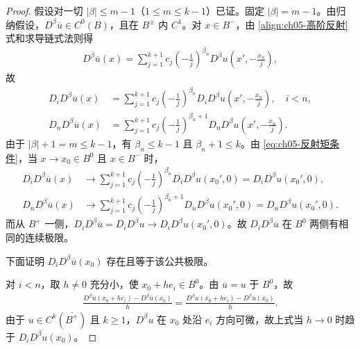 \documentclass[../../main.tex]{subfiles}
\begin{document}
\begin{proof}
假设对一切 $|\beta|\leqslant m-1$（$1\leqslant m\leqslant k-1$）已证。固定 $|\beta|=m-1$。由归纳假设，$D^{\beta}\overline{u}\in C^{0}(B)$，且在 $B^{\pm}$ 内 $C^{1}$。对 $x\in B^{-}$，由 \eqref{align:ch05-高阶反射}式和求导链式法则得
\begin{align}
D^{\beta}\overline{u}(x)
=\sum_{j=1}^{k+1}c_j\left(-\frac{1}{j}\right)^{\beta_n}
D^{\beta}u\left(x',-\frac{x_n}{j}\right),
\label{eq:ch05-反射导数}
\end{align}
故
\begin{align*}
D_iD^{\beta}\overline{u}(x)
&=\sum_{j=1}^{k+1}c_j\left(-\frac{1}{j}\right)^{\beta_n}
D_iD^{\beta}u\left(x',-\frac{x_n}{j}\right),\quad i<n,\\
D_nD^{\beta}\overline{u}(x)
&=\sum_{j=1}^{k+1}c_j\left(-\frac{1}{j}\right)^{\beta_n+1}
D_nD^{\beta}u\left(x',-\frac{x_n}{j}\right).
\end{align*}
由于 $|\beta|+1=m\leqslant k-1$，有 $\beta_n\leqslant k-1$ 且 $\beta_n+1\leqslant k$。由 \eqref{eq:ch05-反射矩条件}，当 $x\to x_0\in B^{0}$ 且 $x\in B^{-}$ 时，
\begin{align*}
D_iD^{\beta}\overline{u}(x)
&\longrightarrow\sum_{j=1}^{k+1}c_j\left(-\frac{1}{j}\right)^{\beta_n}D_iD^{\beta}u(x_0',0)
=D_iD^{\beta}u(x_0',0),\\
D_nD^{\beta}\overline{u}(x)
&\longrightarrow\sum_{j=1}^{k+1}c_j\left(-\frac{1}{j}\right)^{\beta_n+1}D_nD^{\beta}u(x_0',0)
=D_nD^{\beta}u(x_0',0).
\end{align*}
而从 $B^{+}$ 一侧，$D_iD^{\beta}\overline{u}=D_iD^{\beta}u\to D_iD^{\beta}u(x_0',0)$。故 $D_iD^{\beta}\overline{u}$ 在 $B^{0}$ 两侧有相同的连续极限。

下面证明 $D_iD^{\beta}\overline{u}(x_0)$ 存在且等于该公共极限。

对 $i<n$，取 $h\neq0$ 充分小，使 $x_0+he_i\in B^{0}$。由 $\overline{u}=u$ 于 $B^{0}$，故
\begin{align*}
\frac{D^{\beta}\overline{u}(x_0+he_i)-D^{\beta}\overline{u}(x_0)}{h}
=\frac{D^{\beta}u(x_0+he_i)-D^{\beta}u(x_0)}{h}.
\end{align*}
由于 $u\in C^{k}(\overline{B^{+}})$ 且 $k\geqslant1$，$D^{\beta}u$ 在 $x_0$ 处沿 $e_i$ 方向可微，故上式当 $h\to0$ 时趋于 $D_iD^{\beta}u(x_0)$。


\end{proof}
\end{document}
